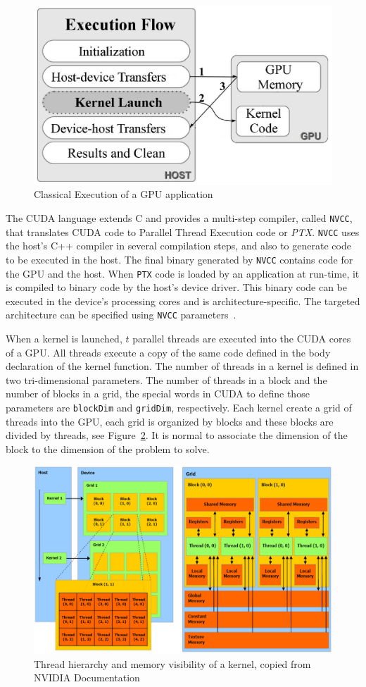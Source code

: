 \begin {figure}[htpb]
  \centering
  \includegraphics[width =.45\textwidth] {images/modelo-classico-execucao.png}
  \caption{Classical Execution of a GPU application}
  \label{fig:cuda:model}
\end {figure}

The CUDA language extends C and provides a multi-step compiler, called \texttt{NVCC}, that translates CUDA code to Parallel Thread Execution code or \emph{PTX}. \texttt{NVCC} uses the host's C++ compiler in several compilation steps, and also to generate code to be executed in the host. The final binary generated by \texttt{NVCC} contains code for the GPU and the host. When \texttt{PTX} code is loaded by an application at run-time, it is compiled to binary code by the host's device driver. This binary code can be executed in the device's processing cores and is architecture-specific. The targeted architecture can be specified using \texttt{NVCC} parameters~\citep{CUDAGuide}. 

When a kernel is launched, $t$ parallel threads are executed into the CUDA cores of a GPU. All threads execute a copy of the same code defined in the body declaration of the kernel function. The number of threads in a kernel is defined in two tri-dimensional parameters. The number of threads in a block and the number of blocks in a grid, the special words in CUDA to define those parameters are \texttt{blockDim} and \texttt{gridDim}, respectively. Each kernel create a grid of threads into the GPU, each grid is organized by blocks and these blocks are divided by threads, see Figure~\ref{fig:dimGridBlock}. It is normal to associate the dimension of the block to the dimension of the problem to solve.

\begin{figure}[htpb]
    \centering
    \includegraphics[scale=.85]{images/Kernel-grid-organization.png}
\caption{Thread hierarchy and memory visibility of a kernel, copied from NVIDIA Documentation}
\label{fig:dimGridBlock}
\end{figure}


